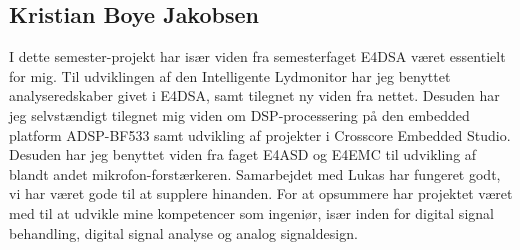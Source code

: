 \subsection*{Kristian Boye Jakobsen}
I dette semester-projekt har især viden fra semesterfaget E4DSA været essentielt for mig. Til udviklingen af den Intelligente Lydmonitor har jeg benyttet analyseredskaber givet i E4DSA, samt tilegnet ny viden fra nettet. 
Desuden har jeg selvstændigt tilegnet mig viden om DSP-processering på den embedded platform ADSP-BF533 samt udvikling af projekter i Crosscore Embedded Studio. Desuden har jeg benyttet viden fra faget E4ASD og E4EMC til udvikling af blandt andet mikrofon-forstærkeren.
Samarbejdet med Lukas har fungeret godt, vi har været gode til at supplere hinanden.
For at opsummere har projektet været med til at udvikle mine kompetencer som ingeniør, især inden for digital signal behandling, digital signal analyse og analog signaldesign. 
